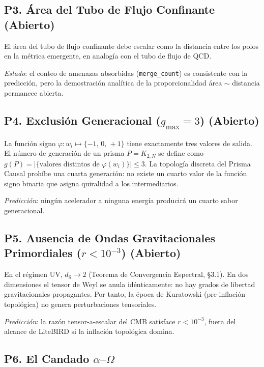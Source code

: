\documentclass[11pt, a4paper, openany]{book}
\newcommand{\dS}{d_{\mathrm{S}}}
\begin{document}
\subsection*{P3. \'Area del Tubo de Flujo Confinante (Abierto)}
\label{open:flux-tube-area}

El \'area del tubo de flujo confinante debe escalar como la distancia
entre los polos en la m\'etrica emergente, en analog\'ia con el tubo
de flujo de QCD.

\medskip\noindent
\textit{Estado}: el conteo de amenazas absorbidas
(\texttt{merge\_count}) es consistente con la predicci\'on, pero la
demostraci\'on anal\'itica de la proporcionalidad \'area $\sim$
distancia permanece abierta.

\subsection*{P4. Exclusi\'on Generacional ($g_{\max} = 3$) (Abierto)}
\label{open:gen-exclusion}

La funci\'on signo $\varphi \colon w_i \mapsto \{-1,\,0,\,+1\}$ tiene
exactamente tres valores de salida. El n\'umero de generaci\'on de un
prisma $P = K_{2,N}$ se define como $g(P) = |\{\text{valores distintos
de } \varphi(w_i)\}| \leq 3$. La topolog\'ia discreta del Prisma Causal
proh\'ibe una cuarta generaci\'on: no existe un cuarto valor de la
funci\'on signo binaria que asigna quiralidad a los intermediarios.

\medskip\noindent
\textit{Predicci\'on}: ning\'un acelerador a ninguna energ\'ia
producir\'a un cuarto sabor generacional.

\subsection*{P5. Ausencia de Ondas Gravitacionales Primordiales
  ($r < 10^{-3}$) (Abierto)}
\label{open:no-tensor}

En el r\'egimen UV, $\dS \to 2$ (Teorema de Convergencia Espectral,
\S3.1). En dos dimensiones el tensor de Weyl se anula id\'enticamente:
no hay grados de libertad gravitacionales propagantes. Por tanto, la
\'epoca de Kuratowski (pre-inflaci\'on topol\'ogica) no genera
perturbaciones tensoriales.

\medskip\noindent
\textit{Predicci\'on}: la raz\'on tensor-a-escalar del CMB satisface
$r < 10^{-3}$, fuera del alcance de LiteBIRD si la inflaci\'on
topol\'ogica domina.

\subsection*{P6. El Candado $\alpha$--$\Omega$}
\label{open:alpha-omega-lock}
\end{document}

